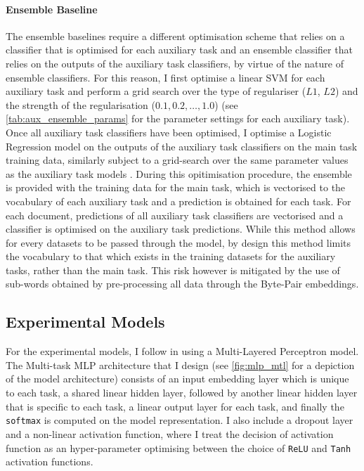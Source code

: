 \paragraph{Ensemble Baseline}
The ensemble baselines require a different optimisation scheme that relies on a classifier that is optimised for each auxiliary task and an ensemble classifier that relies on the outputs of the auxiliary task classifiers, by virtue of the nature of ensemble classifiers.
For this reason, I first optimise a linear SVM for each auxiliary task and perform a grid search over the type of regulariser ({$L1$, $L2$}) and the strength of the regularisation (${0.1, 0.2,\ldots, 1.0}$) (see \cref{tab:aux_ensemble_params} for the parameter settings for each auxiliary task).
Once all auxiliary task classifiers have been optimised, I optimise a Logistic Regression model on the outputs of the auxiliary task classifiers on the main task training data, similarly subject to a grid-search over the same parameter values as the auxiliary task models
.
During this opitimisation procedure, the ensemble is provided with the training data for the main task, which is vectorised to the vocabulary of each auxiliary task and a prediction is obtained for each task.
For each document, predictions of all auxiliary task classifiers are vectorised and a classifier is optimised on the auxiliary task predictions.
While this method allows for every datasets to be passed through the model, by design this method limits the vocabulary to that which exists in the training datasets for the auxiliary tasks, rather than the main task.
This risk however is mitigated by the use of sub-words obtained by pre-processing all data through the Byte-Pair embeddings.

\subsection{Experimental Models}
For the experimental models, I follow \citet{Waseem:2018} in using a Multi-Layered Perceptron model.
The Multi-task MLP architecture that I design (see \cref{fig:mlp_mtl} for a depiction of the model architecture) consists of an input embedding layer which is unique to each task, a shared linear hidden layer, followed by another linear hidden layer that is specific to each task, a linear output layer for each task, and finally the \texttt{softmax} is computed on the model representation.
I also include a dropout layer and a non-linear activation function, where I treat the decision of activation function as an hyper-parameter optimising between the choice of \texttt{ReLU} and \texttt{Tanh} activation functions.


